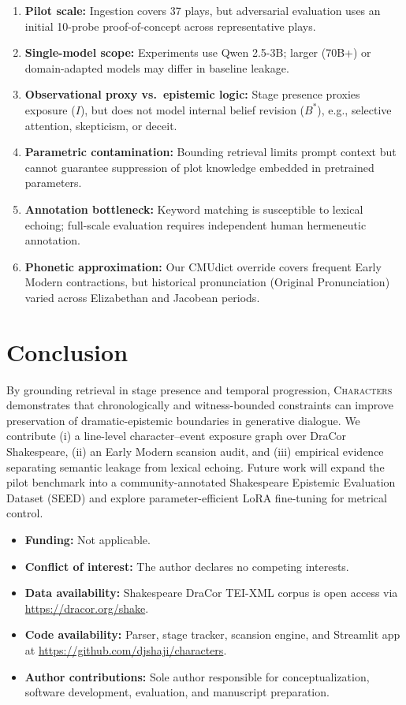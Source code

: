 \documentclass[sn-basic, referee]{sn-jnl}
\begin{document}
\begin{enumerate}
    \item \textbf{Pilot scale:} Ingestion covers 37 plays, but adversarial evaluation uses an initial 10-probe proof-of-concept across representative plays.
    \item \textbf{Single-model scope:} Experiments use Qwen 2.5-3B; larger (70B+) or domain-adapted models may differ in baseline leakage.
    \item \textbf{Observational proxy vs.\ epistemic logic:} Stage presence proxies exposure ($I$), but does not model internal belief revision ($B^*$), e.g., selective attention, skepticism, or deceit.
    \item \textbf{Parametric contamination:} Bounding retrieval limits prompt context but cannot guarantee suppression of plot knowledge embedded in pretrained parameters.
    \item \textbf{Annotation bottleneck:} Keyword matching is susceptible to lexical echoing; full-scale evaluation requires independent human hermeneutic annotation.
    \item \textbf{Phonetic approximation:} Our CMUdict override covers frequent Early Modern contractions, but historical pronunciation (Original Pronunciation) varied across Elizabethan and Jacobean periods.
\end{enumerate}

\section{Conclusion}\label{sec6}
By grounding retrieval in stage presence and temporal progression, \textsc{Characters} demonstrates that chronologically and witness-bounded constraints can improve preservation of dramatic-epistemic boundaries in generative dialogue. We contribute (i) a line-level character--event exposure graph over DraCor Shakespeare, (ii) an Early Modern scansion audit, and (iii) empirical evidence separating semantic leakage from lexical echoing. Future work will expand the pilot benchmark into a community-annotated Shakespeare Epistemic Evaluation Dataset (SEED) and explore parameter-efficient LoRA fine-tuning for metrical control.

\backmatter

\begin{itemize}
\item \textbf{Funding:} Not applicable.
\item \textbf{Conflict of interest:} The author declares no competing interests.
\item \textbf{Data availability:} Shakespeare DraCor TEI-XML corpus is open access via \url{https://dracor.org/shake}.
\item \textbf{Code availability:} Parser, stage tracker, scansion engine, and Streamlit app at \url{https://github.com/djshaji/characters}.
\item \textbf{Author contributions:} Sole author responsible for conceptualization, software development, evaluation, and manuscript preparation.
\end{itemize}


\end{document}
